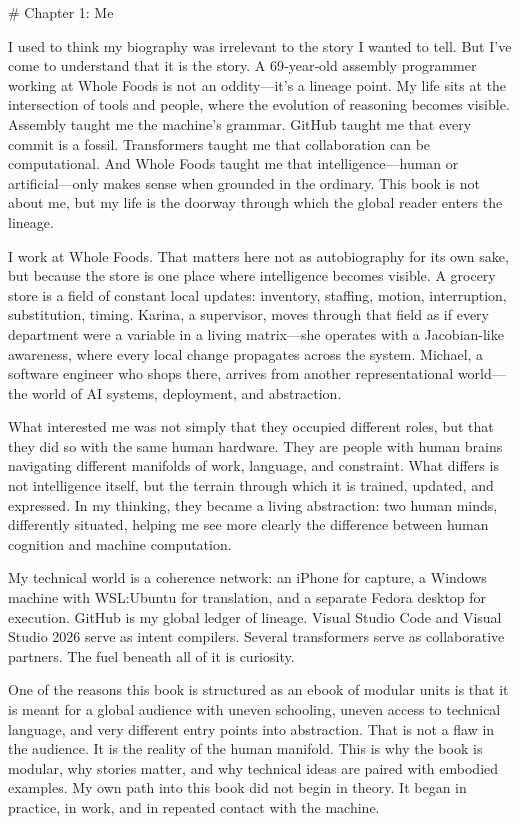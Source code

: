 \documentclass[
]{article}
\begin{document}
\newpage
\vspace*{3cm}
\begin{center}
# Chapter 1: Me
\end{center}

I used to think my biography was irrelevant to the story I wanted to
tell. But I've come to understand that it is the story. A 69‑year‑old
assembly programmer working at Whole Foods is not an oddity---it's a
lineage point. My life sits at the intersection of tools and people,
where the evolution of reasoning becomes visible. Assembly taught me the
machine's grammar. GitHub taught me that every commit is a fossil.
Transformers taught me that collaboration can be computational. And
Whole Foods taught me that intelligence---human or artificial---only
makes sense when grounded in the ordinary. This book is not about me,
but my life is the doorway through which the global reader enters the
lineage.

I work at Whole Foods. That matters here not as autobiography for its
own sake, but because the store is one place where intelligence becomes
visible. A grocery store is a field of constant local updates:
inventory, staffing, motion, interruption, substitution, timing. Karina,
a supervisor, moves through that field as if every department were a
variable in a living matrix---she operates with a Jacobian-like
awareness, where every local change propagates across the system.
Michael, a software engineer who shops there, arrives from another
representational world---the world of AI systems, deployment, and
abstraction.

What interested me was not simply that they occupied different roles,
but that they did so with the same human hardware. They are people with
human brains navigating different manifolds of work, language, and
constraint. What differs is not intelligence itself, but the terrain
through which it is trained, updated, and expressed. In my thinking,
they became a living abstraction: two human minds, differently situated,
helping me see more clearly the difference between human cognition and
machine computation.

My technical world is a coherence network: an iPhone for capture, a
Windows machine with WSL:Ubuntu for translation, and a separate Fedora
desktop for execution. GitHub is my global ledger of lineage. Visual
Studio Code and Visual Studio 2026 serve as intent compilers. Several
transformers serve as collaborative partners. The fuel beneath all of it
is curiosity.

One of the reasons this book is structured as an ebook of modular units
is that it is meant for a global audience with uneven schooling, uneven
access to technical language, and very different entry points into
abstraction. That is not a flaw in the audience. It is the reality of
the human manifold. This is why the book is modular, why stories matter,
and why technical ideas are paired with embodied examples. My own path
into this book did not begin in theory. It began in practice, in work,
and in repeated contact with the machine.
\end{document}
